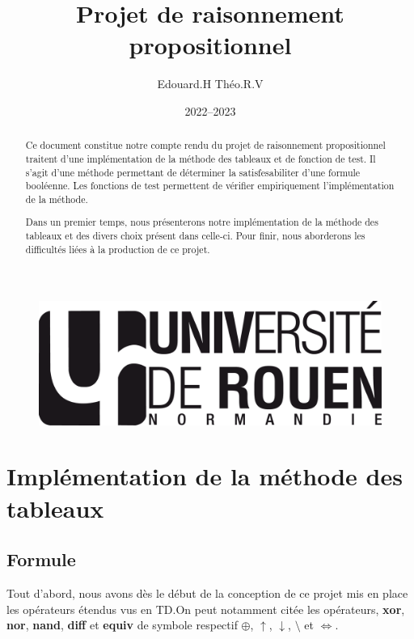 \documentclass[12pt]{article}
\title{Projet de raisonnement propositionnel}
\author{Edouard.H Théo.R.V}
\date{2022--2023}
\begin{document}
    \begin{figure}
        \includegraphics[scale=0.3, right]{logo-univ-rouen-normandie-noir.png}
    \end{figure}

    \maketitle

    \begin{abstract}
        Ce document constitue notre compte rendu du projet de raisonnement
        propositionnel traitent d'une implémentation de la méthode des 
        tableaux et de fonction de test. Il s'agit d'une méthode permettant de 
        déterminer la satisfesabiliter d'une formule booléenne. Les fonctions de 
        test permettent de vérifier empiriquement l'implémentation de la méthode.  
        
        Dans un premier temps, nous présenterons notre implémentation de la 
        méthode des tableaux et des divers choix présent dans celle-ci. Pour 
        finir, nous aborderons les difficultés liées à la production de ce 
        projet.
    \end{abstract}

    \newpage

    \tableofcontents

    \newpage

    \section{Implémentation de la méthode des tableaux}

    \subsection{Formule}

    Tout d'abord, nous avons dès le début de la conception de ce projet mis en 
    place les opérateurs étendus vus en TD.\@ On peut notamment citée les 
    opérateurs, \textbf{xor}, \textbf{nor}, \textbf{nand}, \textbf{diff} et 
    \textbf{equiv} de symbole respectif $\oplus$, $\uparrow$, $\downarrow$, 
    $\setminus$ et $\Leftrightarrow$. 
\end{document}
